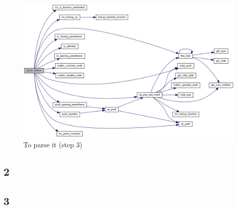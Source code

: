     \begin{figure}[H]
        \centering
        \includegraphics[width=\linewidth]{images/ex7/parse.png}
        \caption{To parse it (step 3)}
    \end{figure}

\subsection{2}

\subsection{3}
